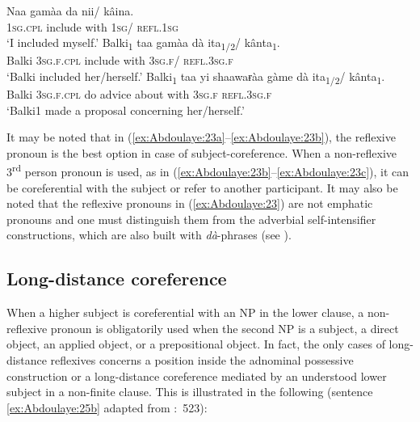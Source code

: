 \documentclass[output=paper]{langscibook}
\begin{document}
\ea%
    \label{ex:Abdoulaye:23}
    \ea \label{ex:Abdoulaye:23a}
    \gll   Naa  gamàa  da  nii/  kâina.\\
    \textsc{1sg.cpl}  include  with  \textsc{1sg}/  \textsc{refl.1sg}\\
    \glt `I included myself.’
    \ex \label{ex:Abdoulaye:23b}
    \gll  Balki\textsubscript{1}  taa  gamàa  dà  ita\textsubscript{1/2}/  kânta\textsubscript{1}.\\
    Balki  \textsc{3sg.f.cpl}  include  with  \textsc{3sg.f}/  \textsc{refl.3sg.f}\\
    \glt `Balki included her/herself.’
    \ex \label{ex:Abdoulaye:23c}
    \gll  Balki\textsubscript{1}  taa  yi  shaawaɍàa  gàme  dà  ita\textsubscript{1/2}/  kânta\textsubscript{1}.\\
    Balki  \textsc{3sg.f.cpl}  do  advice  about  with  \textsc{3sg.f}  \textsc{refl.3sg.f}\\
    \glt `Balki1 made a proposal concerning her/herself.’
    \z
\z 
    

    
It may be noted that in (\ref{ex:Abdoulaye:23a}--\ref{ex:Abdoulaye:23b}), the reflexive pronoun is the best option in case of subject-coreference. When a non-reflexive 3\textsuperscript{rd} person pronoun is used, as in (\ref{ex:Abdoulaye:23b}--\ref{ex:Abdoulaye:23c}), it can be coreferential with the subject or refer to another participant. It may also be noted that the reflexive pronouns in (\ref{ex:Abdoulaye:23}) are not emphatic pronouns and one must distinguish them from the adverbial self-intensifier constructions, which are also built with \textit{dà}{}-phrases (see ).


\subsection{Long-distance coreference}\label{sec:Abdoulaye:4.6}

When a higher subject is coreferential with an NP in the lower clause, a non-reflexive pronoun is obligatorily used when the second NP is a subject, a direct object, an applied object, or a prepositional object. In fact, the only cases of long-distance reflexives concerns a position inside the adnominal possessive construction or a long-distance coreference mediated by an understood lower subject in a non-finite clause. This is illustrated in the following (sentence \ref{ex:Abdoulaye:25b} adapted from \citealt{Newman2000}:~523): 
\end{document}
